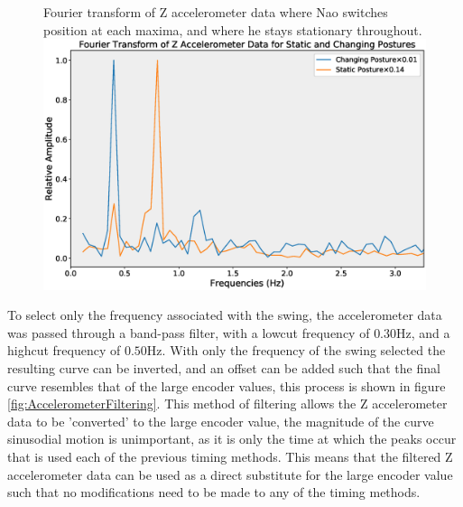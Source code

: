 \documentclass[11pt]{article}
\begin{document}
    \begin{figure}[!htb]
        \centering
        \captionbox
             {Fourier transform of Z accelerometer data where Nao switches position at each maxima, and where he stays stationary throughout.\label{fig:FrequencyDecomposition}}
             {\includegraphics[width=1.0\textwidth]{FrequencyDecomposition.eps}}
    \end{figure}

To select only the frequency associated with the swing, the accelerometer data was passed through a band-pass filter, with a lowcut frequency of $0.30$Hz, and a highcut frequency of $0.50$Hz. With only the frequency of the swing selected the resulting curve can be inverted, and an offset can be added such that the final curve resembles that of the large encoder values, this process is shown in figure \ref{fig:AccelerometerFiltering}. This method of filtering allows the Z accelerometer data to be 'converted' to the large encoder value, the magnitude of the curve sinusodial motion is unimportant, as it is only the time at which the peaks occur that is used each of the previous timing methods. This means that the filtered Z accelerometer data can be used as a direct substitute for the large encoder value such that no modifications need to be made to any of the timing methods.\\
\end{document}
